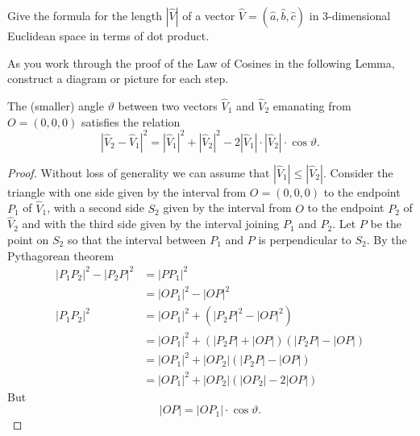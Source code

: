 \begin{exercise}
Give the formula for the length $\left\vert \hat{V}\right\vert $ of a vector
$\hat{V}=\left(  \hat{a},\hat{b},\hat{c}\right)  $ in 3-dimensional Euclidean
space in terms of dot product.
\end{exercise}

\begin{exercise}
As you work through the proof of the Law of Cosines in the following Lemma,
construct a diagram or picture for each step.
\end{exercise}

\begin{lemma}
\label{110} The (smaller) angle $\vartheta$ between two
vectors $\hat{V}_{1}$ and $\hat{V}_{2}$ emanating from $O=\left(
0,0,0\right)  $ satisfies the relation%
\[
\left\vert \hat{V}_{2}-\hat{V}_{1}\right\vert ^{2}=\left\vert \hat{V}%
_{1}\right\vert ^{2}+\left\vert \hat{V}_{2}\right\vert ^{2}-2\left\vert
\hat{V}_{1}\right\vert \cdot\left\vert \hat{V}_{2}\right\vert \cdot
\cos\vartheta.
\]

\end{lemma}

\begin{proof}
Without loss of generality we can assume that $\left\vert \hat{V}%
_{1}\right\vert \leq\left\vert \hat{V}_{2}\right\vert $. Consider the triangle
with one side given by the interval from $O=\left(  0,0,0\right)  $ to the
endpoint $P_{1}$ of $\hat{V}_{1}$, with a second side $S_{2}$ given by the
interval from $O$ to the endpoint $P_{2}$ of $\hat{V}_{2}$ and with the third
side given by the interval joining $P_{1}$ and $P_{2}$. Let $P$ be the point
on $S_{2}$ so that the interval between $P_{1}$ and $P$ is perpendicular to
$S_{2}$. By the Pythagorean theorem%
\begin{align*}
\left\vert P_{1}P_{2}\right\vert ^{2}-\left\vert P_{2}P\right\vert ^{2}  &
=\left\vert PP_{1}\right\vert ^{2}\\
&  =\left\vert OP_{1}\right\vert ^{2}-\left\vert OP\right\vert ^{2}\\
\left\vert P_{1}P_{2}\right\vert ^{2}  &  =\left\vert OP_{1}\right\vert
^{2}+\left(  \left\vert P_{2}P\right\vert ^{2}-\left\vert OP\right\vert
^{2}\right) \\
&  =\left\vert OP_{1}\right\vert ^{2}+\left(  \left\vert P_{2}P\right\vert
+\left\vert OP\right\vert \right)  \left(  \left\vert P_{2}P\right\vert
-\left\vert OP\right\vert \right) \\
&  =\left\vert OP_{1}\right\vert ^{2}+\left\vert OP_{2}\right\vert \left(
\left\vert P_{2}P\right\vert -\left\vert OP\right\vert \right) \\
&  =\left\vert OP_{1}\right\vert ^{2}+\left\vert OP_{2}\right\vert \left(
\left\vert OP_{2}\right\vert -2\left\vert OP\right\vert \right)
\end{align*}
But%
\[
\left\vert OP\right\vert =\left\vert OP_{1}\right\vert \cdot\cos\vartheta.
\]

\end{proof}

